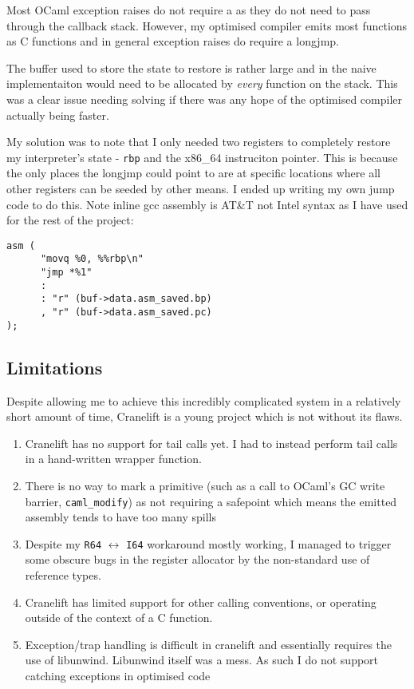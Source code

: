 Most OCaml exception raises do not require a  as they do not need to pass through
the callback stack. However, my optimised compiler emits most functions as C functions and in
general exception raises do require a longjmp.

The buffer used to store the state to restore is rather large and in the naive implementaiton would
need to be allocated by \emph{every} function on the stack. This was a clear issue needing solving
if there was any hope of the optimised compiler actually being faster.

My solution was to note that I only needed two registers to completely restore my interpreter's
state - \texttt{rbp} and the x86\_64 instruciton pointer. This is because the only places the
longjmp could point to are at specific locations where all other registers can be seeded by other
means. I ended up writing my own jump code to do this. Note inline gcc assembly is AT\&T not Intel
syntax as I have used for the rest of the project:

\begin{verbatim}
asm (
      "movq %0, %%rbp\n"
      "jmp *%1"
      :
      : "r" (buf->data.asm_saved.bp)
      , "r" (buf->data.asm_saved.pc)
);
\end{verbatim}

\subsection{Limitations}

Despite allowing me to achieve this incredibly complicated system in a relatively short amount of
time, Cranelift is a young project which is not without its flaws.

\begin{enumerate}
      \item Cranelift has no support for tail calls yet. I had to instead perform tail calls in a
            hand-written wrapper function.
      \item There is no way to mark a primitive (such as a call to OCaml's GC write barrier,
            \texttt{caml\_modify}) as not requiring a safepoint which means the emitted assembly
            tends to have
            too many spills
      \item Despite my \texttt{R64} $\leftrightarrow$ \texttt{I64} workaround mostly working, I
            managed to trigger some obscure bugs in the register allocator by the non-standard use
            of reference
            types.
      \item Cranelift has limited support for other calling conventions, or operating outside of
            the context of a C function.
      \item Exception/trap handling is difficult in cranelift and essentially requires the use of
            libunwind. Libunwind itself was a mess. As such I do not support catching exceptions in
            optimised
            code
\end{enumerate}

